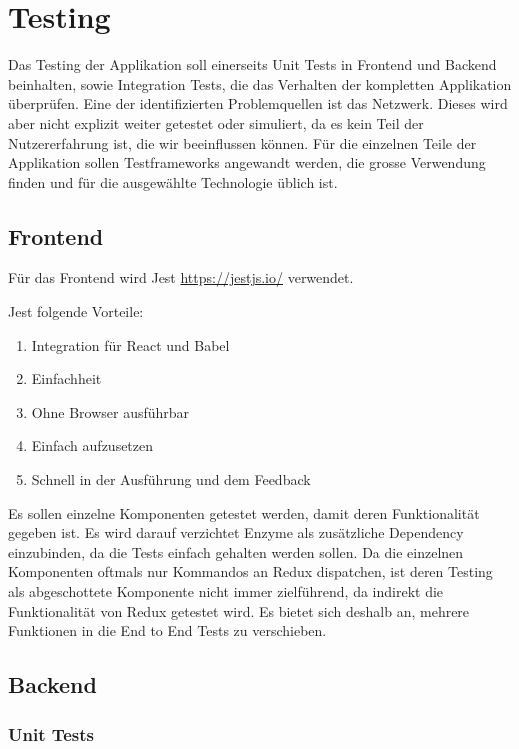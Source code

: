 \section{Testing}

Das Testing der Applikation soll einerseits Unit Tests in Frontend und Backend beinhalten, sowie Integration Tests, die das Verhalten der kompletten Applikation \"uberpr\"ufen.
Eine der identifizierten Problemquellen ist das Netzwerk.
Dieses wird aber nicht explizit weiter getestet oder simuliert, da es kein Teil der Nutzererfahrung ist, die wir beeinflussen k\"onnen.
F\"ur die einzelnen Teile der Applikation sollen Testframeworks angewandt werden, die grosse Verwendung finden und f\"ur die ausgew\"ahlte Technologie \"ublich ist.

\subsection{Frontend}
F\"ur das Frontend wird Jest \url{https://jestjs.io/} verwendet.

Jest folgende Vorteile:

\begin{enumerate}
    \item Integration f\"ur React und Babel
    \item Einfachheit
    \item Ohne Browser ausf\"uhrbar
    \item Einfach aufzusetzen
    \item Schnell in der Ausf\"uhrung und dem Feedback
\end{enumerate}

Es sollen einzelne Komponenten getestet werden, damit deren Funktionalit\"at gegeben ist.
Es wird darauf verzichtet Enzyme als zus\"atzliche Dependency einzubinden, da die Tests einfach gehalten werden sollen.
Da die einzelnen Komponenten oftmals nur Kommandos an Redux dispatchen, ist deren Testing als abgeschottete Komponente nicht immer zielf\"uhrend, da indirekt die Funktionalit\"at von Redux getestet wird.
Es bietet sich deshalb an, mehrere Funktionen in die End to End Tests zu verschieben.

\subsection{Backend}

\subsubsection{Unit Tests}

